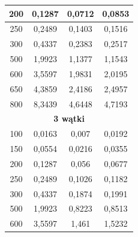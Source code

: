 \documentclass{report}
\begin{document}
\begin{table}[H]
\begin{tabular}{|cccc|}
		\multicolumn{1}{|c|}{200}                       & \multicolumn{1}{c|}{0,1287}     & \multicolumn{1}{c|}{0,0712}      & 0,0853      \\ \hline
		\multicolumn{1}{|c|}{250}                       & \multicolumn{1}{c|}{0,2489}     & \multicolumn{1}{c|}{0,1403}      & 0,1516      \\ \hline
		\multicolumn{1}{|c|}{300}                       & \multicolumn{1}{c|}{0,4337}     & \multicolumn{1}{c|}{0,2383}      & 0,2517      \\ \hline
		\multicolumn{1}{|c|}{500}                       & \multicolumn{1}{c|}{1,9923}     & \multicolumn{1}{c|}{1,1377}      & 1,1543      \\ \hline
		\multicolumn{1}{|c|}{600}                       & \multicolumn{1}{c|}{3,5597}     & \multicolumn{1}{c|}{1,9831}      & 2,0195      \\ \hline
		\multicolumn{1}{|c|}{650}                       & \multicolumn{1}{c|}{4,3859}     & \multicolumn{1}{c|}{2,4186}      & 2,4957      \\ \hline
		\multicolumn{1}{|c|}{800}                       & \multicolumn{1}{c|}{8,3439}     & \multicolumn{1}{c|}{4,6448}      & 4,7193      \\ \hline
		\multicolumn{4}{|c|}{\textbf{3 wątki}}                                                                                             \\ \hline
		\multicolumn{1}{|c|}{100}                       & \multicolumn{1}{c|}{0,0163}     & \multicolumn{1}{c|}{0,007}       & 0,0192      \\ \hline
		\multicolumn{1}{|c|}{150}                       & \multicolumn{1}{c|}{0,0554}     & \multicolumn{1}{c|}{0,0216}      & 0,0355      \\ \hline
		\multicolumn{1}{|c|}{200}                       & \multicolumn{1}{c|}{0,1287}     & \multicolumn{1}{c|}{0,056}       & 0,0677      \\ \hline
		\multicolumn{1}{|c|}{250}                       & \multicolumn{1}{c|}{0,2489}     & \multicolumn{1}{c|}{0,1026}      & 0,1182      \\ \hline
		\multicolumn{1}{|c|}{300}                       & \multicolumn{1}{c|}{0,4337}     & \multicolumn{1}{c|}{0,1874}      & 0,1991      \\ \hline
		\multicolumn{1}{|c|}{500}                       & \multicolumn{1}{c|}{1,9923}     & \multicolumn{1}{c|}{0,8223}      & 0,8513      \\ \hline
		\multicolumn{1}{|c|}{600}                       & \multicolumn{1}{c|}{3,5597}     & \multicolumn{1}{c|}{1,461}       & 1,5232      \\ \hline

\end{tabular}
\end{table}
\end{document}

